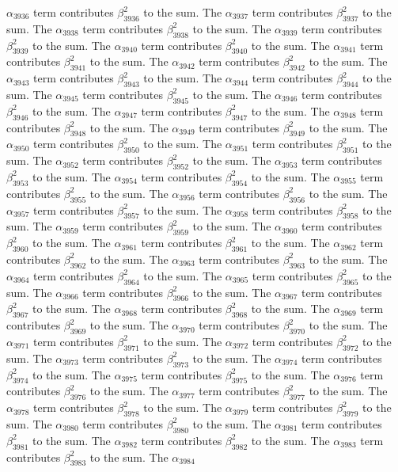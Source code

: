 \begin{lemma}
$\alpha_{3936}$ term contributes $\beta_{3936}^{2}$ to the sum. The $\alpha_{3937}$ term contributes $\beta_{3937}^{2}$ to the sum. The $\alpha_{3938}$ term contributes $\beta_{3938}^{2}$ to the sum. The $\alpha_{3939}$ term contributes $\beta_{3939}^{2}$ to the sum. The $\alpha_{3940}$ term contributes $\beta_{3940}^{2}$ to the sum. The $\alpha_{3941}$ term contributes $\beta_{3941}^{2}$ to the sum. The $\alpha_{3942}$ term contributes $\beta_{3942}^{2}$ to the sum. The $\alpha_{3943}$ term contributes $\beta_{3943}^{2}$ to the sum. The $\alpha_{3944}$ term contributes $\beta_{3944}^{2}$ to the sum. The $\alpha_{3945}$ term contributes $\beta_{3945}^{2}$ to the sum. The $\alpha_{3946}$ term contributes $\beta_{3946}^{2}$ to the sum. The $\alpha_{3947}$ term contributes $\beta_{3947}^{2}$ to the sum. The $\alpha_{3948}$ term contributes $\beta_{3948}^{2}$ to the sum. The $\alpha_{3949}$ term contributes $\beta_{3949}^{2}$ to the sum. The $\alpha_{3950}$ term contributes $\beta_{3950}^{2}$ to the sum. The $\alpha_{3951}$ term contributes $\beta_{3951}^{2}$ to the sum. The $\alpha_{3952}$ term contributes $\beta_{3952}^{2}$ to the sum. The $\alpha_{3953}$ term contributes $\beta_{3953}^{2}$ to the sum. The $\alpha_{3954}$ term contributes $\beta_{3954}^{2}$ to the sum. The $\alpha_{3955}$ term contributes $\beta_{3955}^{2}$ to the sum. The $\alpha_{3956}$ term contributes $\beta_{3956}^{2}$ to the sum. The $\alpha_{3957}$ term contributes $\beta_{3957}^{2}$ to the sum. The $\alpha_{3958}$ term contributes $\beta_{3958}^{2}$ to the sum. The $\alpha_{3959}$ term contributes $\beta_{3959}^{2}$ to the sum. The $\alpha_{3960}$ term contributes $\beta_{3960}^{2}$ to the sum. The $\alpha_{3961}$ term contributes $\beta_{3961}^{2}$ to the sum. The $\alpha_{3962}$ term contributes $\beta_{3962}^{2}$ to the sum. The $\alpha_{3963}$ term contributes $\beta_{3963}^{2}$ to the sum. The $\alpha_{3964}$ term contributes $\beta_{3964}^{2}$ to the sum. The $\alpha_{3965}$ term contributes $\beta_{3965}^{2}$ to the sum. The $\alpha_{3966}$ term contributes $\beta_{3966}^{2}$ to the sum. The $\alpha_{3967}$ term contributes $\beta_{3967}^{2}$ to the sum. The $\alpha_{3968}$ term contributes $\beta_{3968}^{2}$ to the sum. The $\alpha_{3969}$ term contributes $\beta_{3969}^{2}$ to the sum. The $\alpha_{3970}$ term contributes $\beta_{3970}^{2}$ to the sum. The $\alpha_{3971}$ term contributes $\beta_{3971}^{2}$ to the sum. The $\alpha_{3972}$ term contributes $\beta_{3972}^{2}$ to the sum. The $\alpha_{3973}$ term contributes $\beta_{3973}^{2}$ to the sum. The $\alpha_{3974}$ term contributes $\beta_{3974}^{2}$ to the sum. The $\alpha_{3975}$ term contributes $\beta_{3975}^{2}$ to the sum. The $\alpha_{3976}$ term contributes $\beta_{3976}^{2}$ to the sum. The $\alpha_{3977}$ term contributes $\beta_{3977}^{2}$ to the sum. The $\alpha_{3978}$ term contributes $\beta_{3978}^{2}$ to the sum. The $\alpha_{3979}$ term contributes $\beta_{3979}^{2}$ to the sum. The $\alpha_{3980}$ term contributes $\beta_{3980}^{2}$ to the sum. The $\alpha_{3981}$ term contributes $\beta_{3981}^{2}$ to the sum. The $\alpha_{3982}$ term contributes $\beta_{3982}^{2}$ to the sum. The $\alpha_{3983}$ term contributes $\beta_{3983}^{2}$ to the sum. The $\alpha_{3984}$ 
\end{lemma}
